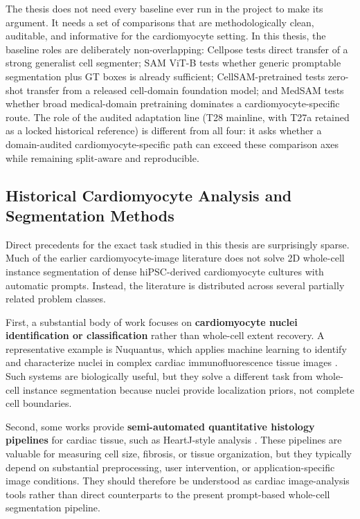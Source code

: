 The thesis does not need every baseline ever run in the project to make its argument. It needs a set of comparisons that are methodologically clean, auditable, and informative for the cardiomyocyte setting. In this thesis, the baseline roles are deliberately non-overlapping: Cellpose tests direct transfer of a strong generalist cell segmenter; SAM ViT-B tests whether generic promptable segmentation plus GT boxes is already sufficient; CellSAM-pretrained tests zero-shot transfer from a released cell-domain foundation model; and MedSAM tests whether broad medical-domain pretraining dominates a cardiomyocyte-specific route. The role of the audited adaptation line (T28 mainline, with T27a retained as a locked historical reference) is different from all four: it asks whether a domain-audited cardiomyocyte-specific path can exceed these comparison axes while remaining split-aware and reproducible.

\subsection{Historical Cardiomyocyte Analysis and Segmentation Methods}\label{historical-cardiomyocyte-analysis-and-segmentation-methods}

Direct precedents for the exact task studied in this thesis are surprisingly sparse. Much of the earlier cardiomyocyte-image literature does not solve 2D whole-cell instance segmentation of dense hiPSC-derived cardiomyocyte cultures with automatic prompts. Instead, the literature is distributed across several partially related problem classes.

First, a substantial body of work focuses on \textbf{cardiomyocyte nuclei identification or classification} rather than whole-cell extent recovery. A representative example is Nuquantus, which applies machine learning to identify and characterize nuclei in complex cardiac immunofluorescence tissue images \cite{gross2016nuquantus}. Such systems are biologically useful, but they solve a different task from whole-cell instance segmentation because nuclei provide localization priors, not complete cell boundaries.

Second, some works provide \textbf{semi-automated quantitative histology pipelines} for cardiac tissue, such as HeartJ-style analysis \cite{droste2023heartj}. These pipelines are valuable for measuring cell size, fibrosis, or tissue organization, but they typically depend on substantial preprocessing, user intervention, or application-specific image conditions. They should therefore be understood as cardiac image-analysis tools rather than direct counterparts to the present prompt-based whole-cell segmentation pipeline.

